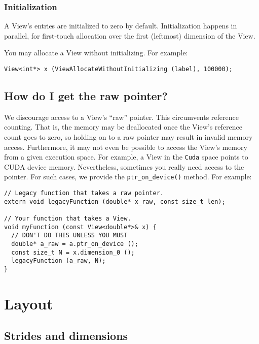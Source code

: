 \subsubsection{Initialization}

A View's entries are initialized to zero by default.  Initialization
happens in parallel, for first-touch allocation over the first
(leftmost) dimension of the View.

You may allocate a View without initializing.  For example:
\begin{lstlisting}
View<int*> x (ViewAllocateWithoutInitializing (label), 100000);
\end{lstlisting}

\subsection{How do I get the raw pointer?}

We discourage access to a View's ``raw'' pointer.  This circumvents
reference counting.  That is, the memory may be deallocated once the
View's reference count goes to zero, so holding on to a raw pointer
may result in invalid memory access.  Furthermore, it may not even be
possible to access the View's memory from a given execution space.
For example, a View in the \lstinline!Cuda! space points to CUDA device
memory.  Nevertheless, sometimes you really need access to the
pointer.  For such cases, we provide the \lstinline!ptr_on_device()!
method.  For example:
\begin{lstlisting}
// Legacy function that takes a raw pointer.
extern void legacyFunction (double* x_raw, const size_t len);

// Your function that takes a View.
void myFunction (const View<double*>& x) {
  // DON'T DO THIS UNLESS YOU MUST
  double* a_raw = a.ptr_on_device ();
  const size_t N = x.dimension_0 ();
  legacyFunction (a_raw, N);
}
\end{lstlisting}

\section{Layout}\label{S:Views:Layout}

\subsection{Strides and dimensions}\label{SS:Views:Layout:Strides}

